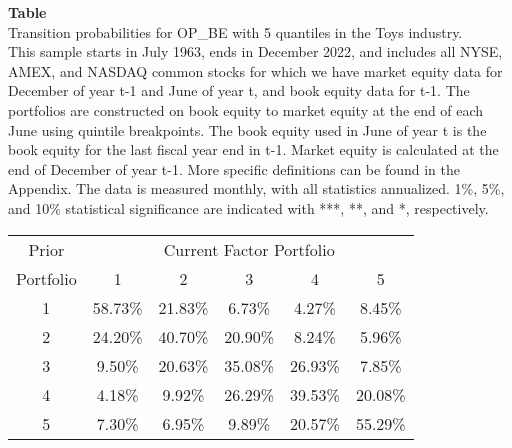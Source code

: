 \begin{table*}[ht!]
\raggedright
{}
\label{tab: transition_probs_OP_BE_Toys_with_5_quantiles}
\textbf{Table \thetable} \\
Transition probabilities for OP_BE with 5 quantiles in the Toys industry. \\
\hspace*{1em}This sample starts in July 1963, ends in December 2022, and includes all NYSE, AMEX, and NASDAQ common stocks for which we have market equity data for December of year t-1 and June of year t, and book equity data for t-1. The portfolios are constructed on book equity to market equity at the end of each June using quintile breakpoints.  The book equity used in June of year t is the book equity for the last fiscal year end in t-1.  Market equity is calculated at the end of December of year t-1.  More specific definitions can be found in the Appendix.  The data is measured monthly, with all statistics annualized.  1\%, 5\%, and 10\% statistical significance are indicated with ***, **, and *, respectively. \\
\vspace{0.5em}
\centering
\begin{adjustbox}{max width=\textwidth}
\begin{tabular}{@{}cccccc@{}}
\toprule
Prior & \multicolumn{5}{c}{Current Factor Portfolio} \\
Portfolio & 1 & 2 & 3 & 4 & 5 \\
\midrule
1 & 58.73\% & 21.83\% & 6.73\% & 4.27\% & 8.45\% \\
2 & 24.20\% & 40.70\% & 20.90\% & 8.24\% & 5.96\% \\
3 & 9.50\% & 20.63\% & 35.08\% & 26.93\% & 7.85\% \\
4 & 4.18\% & 9.92\% & 26.29\% & 39.53\% & 20.08\% \\
5 & 7.30\% & 6.95\% & 9.89\% & 20.57\% & 55.29\% \\
\bottomrule
\end{tabular}
\end{adjustbox}
\end{table*}